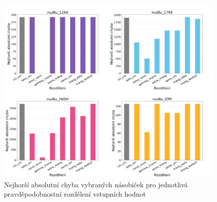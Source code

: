 \begin{figure}[H]
    \centering
    \includegraphics[width=\textwidth]{obrazky-figures/metrics_worst_case_error.png}
    \caption{Nejhorší absolutní chyba vybraných násobiček pro jednotlivá pravděpodobnostní rozdělení vstupních hodnot}
    \label{fig:metrics_worst_case_error}
\end{figure}

